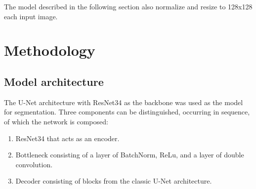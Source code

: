 The model described in the following section also normalize and resize to 128x128 each input image.
\section{Methodology}
\subsection{Model architecture}

The U-Net architecture with ResNet34 as the backbone was used as the model for segmentation. Three components can be distinguished, occurring in sequence, of which the network is composed:
\begin{enumerate}
    \item ResNet34 that acts as an encoder.
    \item Bottleneck consisting of a layer of BatchNorm, ReLu, and a layer of double convolution.
    \item Decoder consisting of blocks from the classic U-Net architecture.
\end{enumerate}

